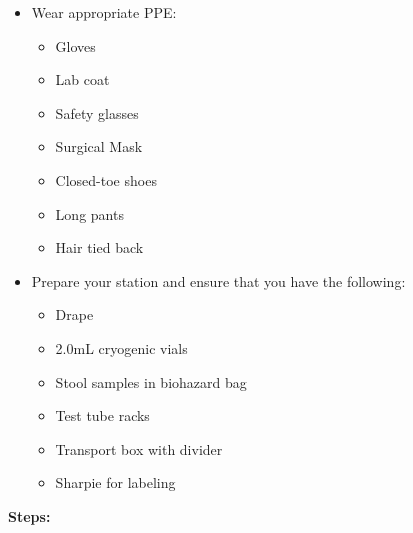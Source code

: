 \documentclass[]{book}
\providecommand{\tightlist}{%
  \setlength{\itemsep}{0pt}\setlength{\parskip}{0pt}}
\begin{document}
\begin{itemize}
\tightlist
\item
  Wear appropriate PPE:

  \begin{itemize}
  \tightlist
  \item
    Gloves
  \item
    Lab coat
  \item
    Safety glasses
  \item
    Surgical Mask
  \item
    Closed-toe shoes
  \item
    Long pants
  \item
    Hair tied back
  \end{itemize}
\item
  Prepare your station and ensure that you have the following:

  \begin{itemize}
  \tightlist
  \item
    Drape
  \item
    2.0mL cryogenic vials
  \item
    Stool samples in biohazard bag
  \item
    Test tube racks
  \item
    Transport box with divider
  \item
    Sharpie for labeling
  \end{itemize}
\end{itemize}

\textbf{Steps:}
\end{document}
